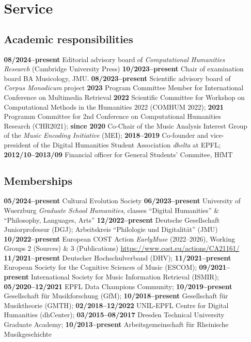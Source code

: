 \section{Service}

\subsection{Academic responsibilities}

\textbf{08/2024--present} Editorial advisory board of \emph{Computational Humanities Research} (Cambridge University Press)
\textbf{10/2023--present} Chair of examination board BA Musicology, JMU. 
\textbf{08/2023--present} Scientific advisory board of \textit{Corpus Monodicum} project
\textbf{2023} Program Committee Member for International Conference on Multimedia
Retrieval
\textbf{2022} Scientific Committee for Workshop on Computational Methods in the Humanities 2022 (COMHUM 2022);
\textbf{2021} Programm Committee for 2nd Conference on Computational Humanities Research (CHR2021);
\textbf{since 2020} Co-Chair of the Music Analysis Interest Group of the \emph{Music Encoding Initiative} (MEI);
\textbf{2018--2019} Co-founder and vice-president of the Digital Humanities Student Association \emph{dhelta} at EPFL;
\textbf{2012/10--2013/09} Financial officer for General Students' Commitee, HfMT

\subsection{Memberships}

\textbf{05/2024--present} Cultural Evolution Society
\textbf{06/2023--present} University of Wuerzburg \emph{Graduate School Humanities}, classes ``Digital Humanities'' \& ``Philosophy, Languages, Arts''
\textbf{12/2022--present} Deutsche Gesellschaft Juniorprofessur (DGJ); Arbeitskreis ``Philologie und Digitalität'' (JMU)
\textbf{10/2022--present} European COST Action \emph{EarlyMuse} (2022--2026), Working Groups 2 (Sources) \& 3 (Publications) \url{https://www.cost.eu/actions/CA21161/}
\textbf{11/2021--present} Deutscher Hochschulverband (DHV);
\textbf{11/2021--present} European Society for the Cognitive Sciences of Music (ESCOM);
\textbf{09/2021--present} International Society for Music Information Retrieval (ISMIR);
\textbf{05/2020--12/2021} EPFL Data Champions Community;
\textbf{10/2019--present} Gesellschaft f{\"u}r Musikforschung (GfM);
\textbf{10/2018--present} Gesellschaft f{\"u}r Musiktheorie (GMTH);
\textbf{02/2018--12/2022} UNIL-EPFL Centre for Digital Humanities (dhCenter);
\textbf{03/2015--08/2017} Dresden Technical University Graduate Academy;
\textbf{10/2013--present} Arbeitsgemeinschaft für Rheinische Musikgeschichte

